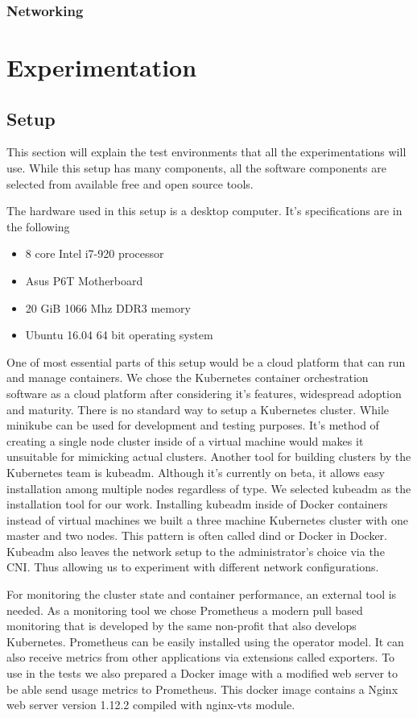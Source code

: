 \documentclass[12pt,oneandhalf,chaparabic,ceng,ms,eng,oneside,pntc]{gsufbe}
\begin{document}
\subsection{Networking}

\chapter{Experimentation}
\section{Setup}
This section will explain the test environments that all the experimentations will use. While this
setup has many components, all the software components are selected from available free and open source
tools.

The hardware used in this setup is a desktop computer. It's specifications are in the following
\begin{itemize}
 \item 8 core Intel i7-920 processor
 \item Asus P6T Motherboard
 \item 20 GiB 1066 Mhz DDR3 memory
 \item Ubuntu 16.04 64 bit operating system
\end{itemize}

One of most essential parts of this setup would be a cloud platform that can run and manage containers.
We chose the Kubernetes container orchestration software as a cloud platform after considering it's
features, widespread adoption and maturity. There is no standard way to setup a Kubernetes cluster.
While minikube can be used for development and testing purposes. It's method of creating a single node
cluster inside of a virtual machine would makes it unsuitable for mimicking actual clusters. Another
tool for building clusters by the Kubernetes team is kubeadm. Although it's currently on beta, it
allows easy installation among multiple nodes regardless of type. We selected kubeadm as the 
installation tool for our work. Installing kubeadm inside of Docker containers instead of virtual
machines we built a three machine Kubernetes cluster with one master and two nodes. This pattern is
often called dind or Docker in Docker. Kubeadm also leaves the network setup to the administrator's
choice via the CNI. Thus allowing us to experiment with different network configurations.

For monitoring the cluster state and container performance, an external tool is needed. As a monitoring
tool we chose Prometheus a modern pull based monitoring that is developed by the same non-profit that
also develops Kubernetes. Prometheus can be easily installed using the operator model. It can also
receive metrics from other applications via extensions called exporters. To use in the tests we also 
prepared a Docker image with a modified web server to be able send usage metrics to Prometheus. This
docker image contains a Nginx web server version 1.12.2 compiled with nginx-vts module.
\end{document}
